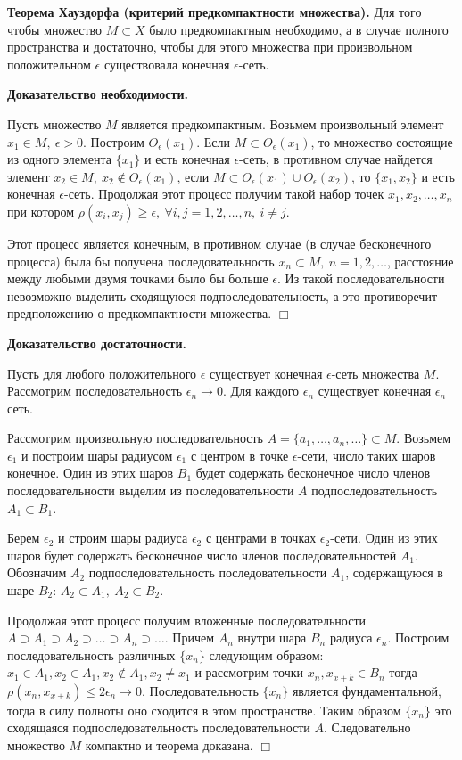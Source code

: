 \documentclass[14pt,a4paper]{extarticle}
\theoremstyle{definition}
\theoremstyle{remark}
\renewcommand{\[}{\begin{dmath*}[compact]}
\renewcommand{\]}{\end{dmath*}}
\newcommand{\sep}{ , \ \allowbreak }
\newcommand{\tth}[1][]{\textbf{Теорема#1.}}
\newcommand{\btev}[1][]{\textbf{Доказательство#1.}
}
\newcommand{\etev}{$\Box$}
\begin{document}
\tth[ Хауздорфа (критерий предкомпактности множества)] Для того чтобы множество $M\subset X$ было предкомпактным необходимо, а в случае полного пространства и достаточно, чтобы для этого множества при произвольном положительном $\epsilon$ существовала конечная $\epsilon$-сеть.

\btev[ необходимости]
  Пусть множество $M$ является предкомпактным. Возьмем произвольный элемент $x_1 \in M\sep \epsilon > 0$.
  Построим $O_{\epsilon}(x_1)$. Если $M \subset O_{\epsilon}(x_1)$, то множество состоящие из одного элемента $\{x_1\}$ и есть конечная $\epsilon$-сеть, в противном случае найдется элемент $x_2 \in M\sep x_2 \not\in O_\epsilon(x_1)$, если $M\subset O_\epsilon(x_1)\cup O_\epsilon(x_2)$, то $\{x_1,x_2\}$ и есть конечная $\epsilon$-сеть. Продолжая этот процесс получим такой набор точек $x_1, x_2,\dots,x_n$ при котором $\rho(x_i,x_j)\geq \epsilon\sep \forall i,j=1,2,\dots,n\sep i\neq j$.

  Этот процесс является конечным, в противном случае (в случае бесконечного процесса) была бы получена последовательность ${x_n}\subset M\sep n=1,2,\dots$, расстояние между любыми двумя точками было бы больше $\epsilon$. Из такой последовательности невозможно выделить сходящуюся подпоследовательность, а это противоречит предположению о предкомпактности множества.
\etev

\btev[ достаточности]
  Пусть для любого положительного $\epsilon$ существует конечная $\epsilon$-сеть множества $M$. Рассмотрим последовательность $\epsilon_n \to 0$. Для каждого $\epsilon_n$ существует конечная $\epsilon_n$ сеть.

  Рассмотрим произвольную последовательность $A=\{a_{1},\dots,a_n,\dots\}\subset M$. Возьмем $\epsilon_1$ и построим шары радиусом $\epsilon_1$ с центром в точке $\epsilon$-сети, число таких шаров конечное. Один из этих шаров $B_1$ будет содержать бесконечное число членов последовательности выделим из последовательности $A$ подпоследовательность $A_1\subset B_1$.

  Берем $\epsilon_2$ и строим шары радиуса $\epsilon_2$ с центрами в точках $\epsilon_2$-сети. Один из этих шаров будет содержать бесконечное число членов последовательностей $A_1$. Обозначим $A_2$ подпоследовательность последовательности $A_1$, содержащуюся в шаре $B_2$: $A_2\subset A_1\sep A_2\subset B_2$.

  Продолжая этот процесс получим вложенные последовательности $A\supset A_1\supset A_2\supset \dots\supset A_n\supset \dots$. Причем $A_n$ внутри шара $B_n$ радиуса $\epsilon_n$. Построим последовательность различных $\{x_n\}$ следующим образом: $x_1 \in A_1, x_2 \in A_1, x_2 \not\in A_1, x_2 \neq x_1$ и рассмотрим точки $x_n, x_{x+k} \in B_n$ тогда $\rho(x_n,x_{x+k})\leq 2 \epsilon_n \to 0$. Последовательность $\{x_n\}$ является фундаментальной, тогда в силу полноты оно сходится в этом пространстве. Таким образом $\{x_n\}$ это сходящаяся подпоследовательность последовательности $A$. Следовательно множество $M$ компактно и теорема доказана.
\etev
\end{document}
